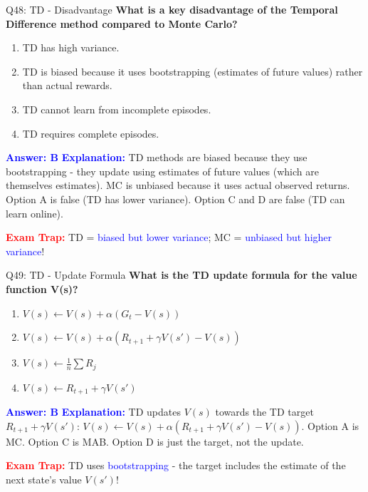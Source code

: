 \documentclass[8pt]{beamer}
\begin{document}
	\begin{frame}{Q48: TD - Disadvantage}
		\fontsize{6.5}{7.5}\selectfont
		\textbf{What is a key disadvantage of the Temporal Difference method compared to Monte Carlo?}
		
		\begin{enumerate}
			\item TD has high variance.
			\item TD is biased because it uses bootstrapping (estimates of future values) rather than actual rewards.
			\item TD cannot learn from incomplete episodes.
			\item TD requires complete episodes.
		\end{enumerate}
		
		\vspace{0.1cm}
		\textcolor{blue}{\textbf{Answer: B}}
		\vspace{0.1cm}
		\textcolor{blue}{\textbf{Explanation:}} TD methods are biased because they use bootstrapping - they update using estimates of future values (which are themselves estimates). MC is unbiased because it uses actual observed returns. Option A is false (TD has lower variance). Option C and D are false (TD can learn online).
		
		\textcolor{red}{\textbf{Exam Trap:}} TD = \textcolor{blue}{biased but lower variance}; MC = \textcolor{blue}{unbiased but higher variance}!
	\end{frame}
	
	\begin{frame}{Q49: TD - Update Formula}
		\fontsize{6.5}{7.5}\selectfont
		\textbf{What is the TD update formula for the value function V(s)?}
		
		\begin{enumerate}
			\item $V(s) \leftarrow V(s) + \alpha(G_t - V(s))$
			\item $V(s) \leftarrow V(s) + \alpha(R_{t+1} + \gamma V(s') - V(s))$
			\item $V(s) \leftarrow \frac{1}{n}\sum R_j$
			\item $V(s) \leftarrow R_{t+1} + \gamma V(s')$
		\end{enumerate}
		
		\vspace{0.1cm}
		\textcolor{blue}{\textbf{Answer: B}}
		\vspace{0.1cm}
		\textcolor{blue}{\textbf{Explanation:}} TD updates $V(s)$ towards the TD target $R_{t+1} + \gamma V(s')$: $V(s) \leftarrow V(s) + \alpha(R_{t+1} + \gamma V(s') - V(s))$. Option A is MC. Option C is MAB. Option D is just the target, not the update.
		
		\textcolor{red}{\textbf{Exam Trap:}} TD uses \textcolor{blue}{bootstrapping} - the target includes the estimate of the next state's value $V(s')$!
	\end{frame}
	
\end{document}
